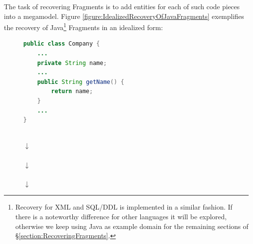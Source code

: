 The task of recovering \glspl{Fragment} is to add entities for each of such code pieces into a megamodel.
Figure \ref{figure:IdealizedRecoveryOfJavaFragments} exemplifies the recovery of \gls{Java}\footnote{Recovery for \gls{XML} and \gls{SQL/DDL} is implemented in a similar fashion.
If there is a noteworthy difference for other languages it will be explored, otherwise we keep using \gls{Java} as example domain for the remaining sections of §\ref{section:RecoveringFragments}.} \glspl{Fragment} in an idealized form:
\begin{figure}[h!]
\begin{center}
\begin{minipage}{0.5\textwidth}
\begin{lstlisting}[language=Java,numbers=none]
public class Company {
	...
	private String name;
	...
	public String getName() {
		return name;
	}
	...
}
\end{lstlisting}
\end{minipage}
\\\vspace*{5mm}
{
\LARGE
\bfseries
$\downarrow$
}
\\\vspace*{5mm}
\\\vspace*{5mm}
{
\LARGE
\bfseries
$\downarrow$
}
\\\vspace*{5mm}
\\\vspace*{5mm}
{
\LARGE
\bfseries
$\downarrow$
}
\\\vspace*{5mm}

\end{center}
\end{figure}
